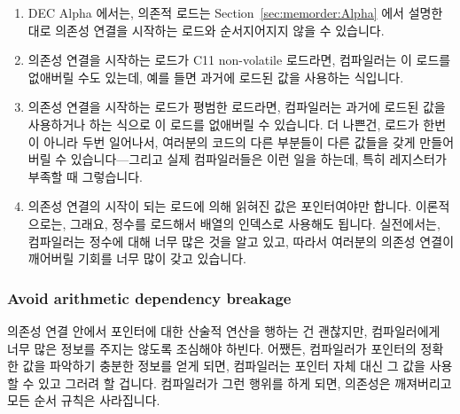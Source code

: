 \begin{enumerate}
\item	DEC Alpha 에서는, 의존적 로드는 Section~\ref{sec:memorder:Alpha} 에서
	설명한 대로 의존성 연결을 시작하는 로드와 순서지어지지 않을 수
	있습니다.
\item	의존성 연결을 시작하는 로드가 C11 non-volatile
	 로드라면, 컴파일러는 이 로드를 없애버릴 수도
	있는데, 예를 들면 과거에 로드된 값을 사용하는 식입니다.
\item	의존성 연결을 시작하는 로드가 평범한 로드라면, 컴파일러는 과거에 로드된
	값을 사용하거나 하는 식으로 이 로드를 없애버릴 수 있습니다.
	더 나쁜건, 로드가 한번이 아니라 두번 일어나서, 여러분의 코드의 다른
	부분들이 다른 값들을 갖게 만들어 버릴 수 있습니다---그리고 실제
	컴파일러들은 이런 일을 하는데, 특히 레지스터가 부족할 때 그렇습니다.
\item	의존성 연결의 시작이 되는 로드에 의해 읽혀진 값은 포인터여야만 합니다.
	이론적으로는, 그래요, 정수를 로드해서 배열의 인덱스로 사용해도 됩니다.
	실전에서는, 컴파일러는 정수에 대해 너무 많은 것을 알고 있고, 따라서
	여러분의 의존성 연결이 깨어버릴 기회를 너무 많이 갖고 있습니다.

\end{enumerate}

\subsubsection{Avoid arithmetic dependency breakage}
의존성 연결 안에서 포인터에 대한 산술적 연산을 행하는 건 괜찮지만, 컴파일러에게
너무 많은 정보를 주지는 않도록 조심해야 하빈다.
어쨌든, 컴파일러가 포인터의 정확한 값을 파악하기 충분한 정보를 얻게 되면,
컴파일러는 포인터 자체 대신 그 값을 사용할 수 있고 그러려 할 겁니다.
컴파일러가 그런 행위를 하게 되면, 의존성은 깨져버리고 모든 순서 규칙은
사라집니다.
\iffalse

